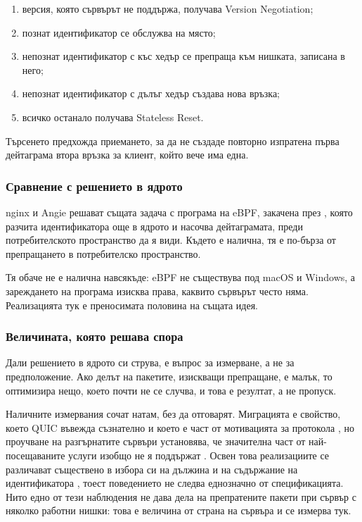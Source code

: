 \begin{enumerate}[nosep]
  \item версия, която сървърът не поддържа, получава Version Negotiation;
  \item познат идентификатор се обслужва на място;
  \item непознат идентификатор с къс хедър се препраща към нишката, записана в него;
  \item непознат идентификатор с дълъг хедър създава нова връзка;
  \item всичко останало получава Stateless Reset.
\end{enumerate}

Търсенето предхожда приемането, за да не създаде повторно изпратена първа дейтаграма
втора връзка за клиент, който вече има една.

\subsubsection{Сравнение с решението в ядрото}

nginx и Angie решават същата задача с програма на eBPF, закачена през
, която разчита идентификатора още в ядрото и насочва
дейтаграмата, преди потребителското пространство да я види. Където е налична, тя е
по-бърза от препращането в потребителско пространство.

Тя обаче не е налична навсякъде: eBPF не съществува под macOS и Windows, а зареждането на
програма изисква права, каквито сървърът често няма. Реализацията тук е преносимата
половина на същата идея.

\subsubsection{Величината, която решава спора}

Дали решението в ядрото си струва, е въпрос за измерване, а не за предположение. Ако делът
на пакетите, изискващи препращане, е малък, то оптимизира нещо, което почти не се случва,
и това е резултат, а не пропуск.

Наличните измервания сочат натам, без да отговарят. Миграцията е свойство, което QUIC въвежда
съзнателно и което е част от мотивацията за протокола \cite{langley2017quic}, но проучване на
разгърнатите сървъри установява, че значителна част от най-посещаваните услуги изобщо не я
поддържат \cite{buchet2025migration}. Освен това реализациите се различават съществено в
избора си на дължина и на съдържание на идентификатора \cite{marx2020same}, тоест поведението
не следва еднозначно от спецификацията. Нито едно от тези наблюдения не дава дела на
препратените пакети при сървър с няколко работни нишки: това е величина от страна на сървъра
и се измерва тук.

